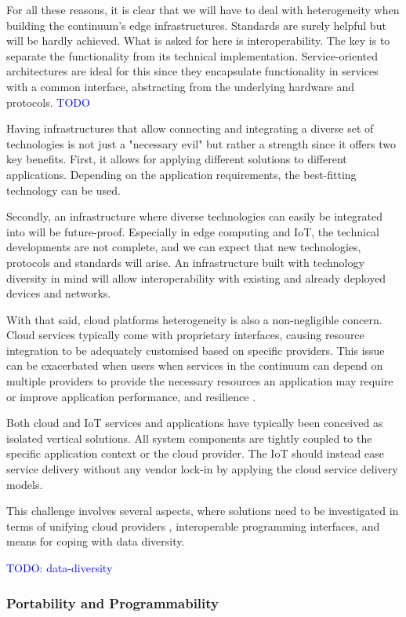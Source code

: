 \documentclass{ieeeaccess}
\begin{document}
For all these reasons, it is clear that we will have to deal with heterogeneity when building the continuum's edge infrastructures. Standards are surely helpful but will be hardly achieved. What is asked for here is interoperability. The key is to separate the functionality from its technical implementation. Service-oriented architectures are ideal for this since they encapsulate functionality in services with a common interface, abstracting from the underlying hardware and protocols. \textcolor{blue}{TODO}

Having infrastructures that allow connecting and integrating a diverse set of technologies is not just a "necessary evil" but rather a strength since it offers two key benefits. First, it allows for applying different solutions to different applications. Depending on the application requirements, the best-fitting technology can be used.

Secondly, an infrastructure where diverse technologies can easily be integrated into will be future-proof. Especially in edge computing and IoT, the technical developments are not complete, and we can expect that new technologies, protocols and standards will arise. An infrastructure built with technology diversity in mind will allow interoperability with existing and already deployed devices and networks.

With that said, cloud platforms heterogeneity is also a non-negligible concern. Cloud services typically come with proprietary interfaces, causing resource integration to be adequately customised based on specific providers. This issue can be exacerbated when users when services in the continuum can depend on multiple providers to provide the necessary resources an application may require or improve application performance, and resilience \cite{cloud-iot}.

Both cloud and IoT services and applications have typically been conceived as isolated vertical solutions. All system components are tightly coupled to the specific application context or the cloud provider. The IoT should instead ease service delivery without any vendor lock-in by applying the cloud service delivery models.

This challenge involves several aspects, where solutions need to be investigated in terms of unifying cloud providers \cite{inter-cloud}, interoperable programming interfaces, and means for coping with data diversity.

\textcolor{blue}{TODO: data-diversity}

\subsubsection{Portability and Programmability}
\end{document}
